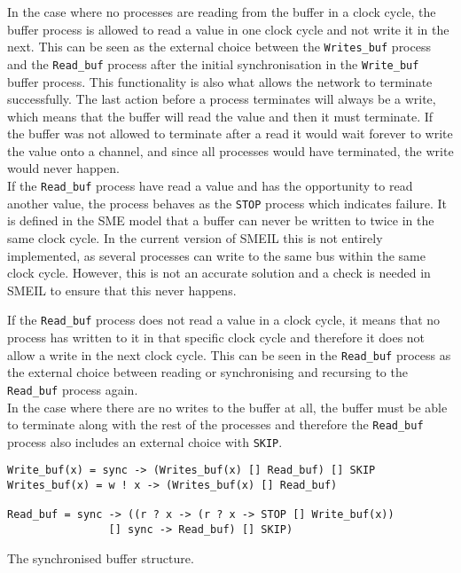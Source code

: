 In the case where no processes are reading from the buffer in a clock cycle, the buffer process is allowed to read a value in one clock cycle and not write it in the next. This can be seen as the external choice between the \texttt{Writes\_buf} process and the \texttt{Read\_buf} process after the initial synchronisation in the \texttt{Write\_buf} buffer process. This functionality is also what allows the network to terminate successfully.
The last action before a process terminates will always be a write, which means that the buffer will read the value and then it must terminate. If the buffer was not allowed to terminate after a read it would wait forever to write the value onto a channel, and since all processes would have terminated, the write would never happen.\\

If the \texttt{Read\_buf} process have read a value and has the opportunity to read another value, the process behaves as the \texttt{STOP} process which indicates failure. It is defined in the SME model that a buffer can never be written to twice in the same clock cycle. In the current version of SMEIL this is not entirely implemented, as several processes can write to the same bus within the same clock cycle. However, this is not an accurate solution and a check is needed in SMEIL to ensure that this never happens.

If the \texttt{Read\_buf} process does not read a value in a clock cycle, it means that no process has written to it in that specific clock cycle and therefore it does not allow a write in the next clock cycle. This can be seen in the \texttt{Read\_buf} process as the external choice between reading or synchronising and recursing to the \texttt{Read\_buf} process again.\\

In the case where there are no writes to the buffer at all, the buffer must be able to terminate along with the rest of the processes and therefore the \texttt{Read\_buf} process also includes an external choice with \texttt{SKIP}.

\begin{listing}
\begin{verbatim}
Write_buf(x) = sync -> (Writes_buf(x) [] Read_buf) [] SKIP
Writes_buf(x) = w ! x -> (Writes_buf(x) [] Read_buf)

Read_buf = sync -> ((r ? x -> (r ? x -> STOP [] Write_buf(x))
                [] sync -> Read_buf) [] SKIP)
\end{verbatim}
\caption{The synchronised buffer structure.}
\label{lst:buffer}
\end{listing}

